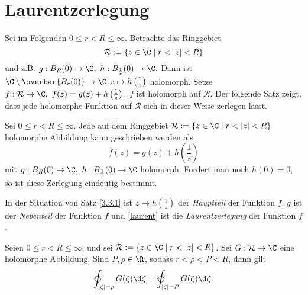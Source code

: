 \section{Laurentzerlegung}\lecture
		
		Sei im Folgenden $ 0 \leq r < R \leq \infty $. Betrachte das Ringgebiet $$ \mathcal{R} := \{z \in \C \mid r < |z| < R\} $$
		und z.B. $ g: B_R(0) \to \C,\ h: B_{\frac{1}{r}}(0) \to \C. $ Dann ist $ \C \setminus \overbar{B_r(0)} \to \C, z \mapsto h\left(\frac{1}{z}\right) $ holomorph. Setze $ f: \mathcal{R} \to \C,\ f(z) = g(z) + h\left(\frac{1}{z}\right). $ $f$ ist holomorph auf $\mathcal{R}$. Der folgende Satz zeigt, dass jede holomorphe Funktion auf $ \mathcal{R} $ sich in dieser Weise zerlegen lässt.
		
		\begin{thmn}[Laurentzerlegung]\label{3.3.1}
			Sei $ 0 \leq r < R \leq \infty $. Jede auf dem Ringgebiet $ \mathcal{R} := \{z \in \C \mid r < |z| < R\} $ holomorphe Abbildung kann geschrieben werden als
			\begin{equation}\label{laurent}
			f(z) = g(z) + h\left(\frac{1}{z}\right)
			\end{equation}
			mit $ g: B_R(0) \to \C,\ h: B_{\frac{1}{r}}(0) \to \C $ holomorph. Fordert man noch $h(0) = 0$, so ist diese Zerlegung eindeutig bestimmt.
		\end{thmn}
		
		\begin{defn}
			In der Situation von Satz \ref{3.3.1} ist $ z \to h\left(\frac{1}{z}\right) $ der \emph{Hauptteil} der Funktion $f$. $g$ ist der \emph{Nebenteil} der Funktion $f$ und \ref{laurent} ist die \emph{Laurentzerlegung} der Funktion $f$.
		\end{defn}
		
		\begin{lem}
			Seien $ 0 \leq r < R \leq \infty $, und sei $ \mathcal{R} := \{z \in \C \mid r < |z| < R\} $. Sei $ G: \mathcal{R} \to \C $ eine holomorphe Abbildung. Sind $ P, \rho \in \R $, sodass $ r < \rho < P < R $, dann gilt 
			\[ \varointctrclockwise_{|\zeta| = \rho} G(\zeta) \d\zeta = \varointctrclockwise_{|\zeta| = P} G(\zeta)\d\zeta. \]
		\end{lem}
		
